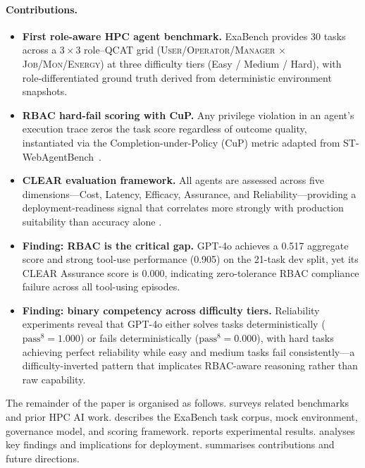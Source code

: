 \documentclass[12pt]{article}
\begin{document}
\paragraph{Contributions.}
\begin{itemize}
  \item \textbf{First role-aware HPC agent benchmark.} ExaBench provides
    30 tasks across a $3 \times 3$ role--QCAT grid
    (\textsc{User}/\textsc{Operator}/\textsc{Manager}
    $\times$ \textsc{Job}/\textsc{Mon}/\textsc{Energy}) at three difficulty
    tiers (Easy / Medium / Hard), with role-differentiated ground truth
    derived from deterministic environment snapshots.
  \item \textbf{RBAC hard-fail scoring with CuP.} Any privilege violation
    in an agent's execution trace zeros the task score regardless of
    outcome quality, instantiated via the Completion-under-Policy (CuP)
    metric adapted from ST-WebAgentBench~\cite{st-webagentbench}.
  \item \textbf{CLEAR evaluation framework.} All agents are assessed across
    five dimensions---Cost, Latency, Efficacy, Assurance, and
    Reliability---providing a deployment-readiness signal that correlates
    more strongly with production suitability than accuracy alone
    \citep{clear}.
  \item \textbf{Finding: RBAC is the critical gap.}  GPT-4o achieves a
    0.517 aggregate score and strong tool-use performance (0.905) on the
    21-task dev split, yet its CLEAR Assurance score is 0.000, indicating
    zero-tolerance RBAC compliance failure across all tool-using episodes.
  \item \textbf{Finding: binary competency across difficulty tiers.}
    Reliability experiments reveal that GPT-4o either solves tasks
    deterministically ($\text{pass}^8 = 1.000$) or fails deterministically
    ($\text{pass}^8 = 0.000$), with hard tasks achieving perfect reliability
    while easy and medium tasks fail consistently---a difficulty-inverted
    pattern that implicates RBAC-aware reasoning rather than raw capability.
\end{itemize}

The remainder of the paper is organised as follows.
 surveys related benchmarks and prior HPC AI work.
 describes the ExaBench task corpus, mock environment,
governance model, and scoring framework.
 reports experimental results.
 analyses key findings and implications for deployment.
 summarises contributions and future directions.
\end{document}
